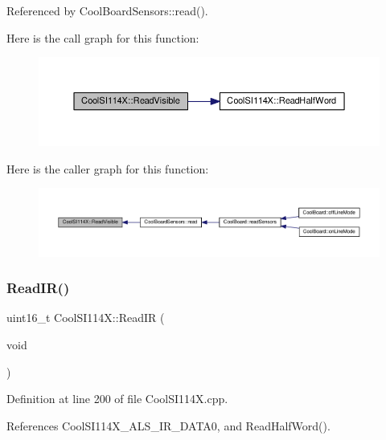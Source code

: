 Referenced by Cool\+Board\+Sensors\+::read().

Here is the call graph for this function\+:\nopagebreak
\begin{figure}[H]
\begin{center}
\leavevmode
\includegraphics[width=350pt]{dd/d67/class_cool_s_i114_x_a42e0e574256341443c647a4c0eda87d5_cgraph}
\end{center}
\end{figure}
Here is the caller graph for this function\+:\nopagebreak
\begin{figure}[H]
\begin{center}
\leavevmode
\includegraphics[width=350pt]{dd/d67/class_cool_s_i114_x_a42e0e574256341443c647a4c0eda87d5_icgraph}
\end{center}
\end{figure}
\mbox{\label{class_cool_s_i114_x_abc536ee7ae8e3ba9d1069acc3889a2cf}} 
\subsubsection{\texorpdfstring{Read\+I\+R()}{ReadIR()}}
{\footnotesize\ttfamily uint16\+\_\+t Cool\+S\+I114\+X\+::\+Read\+IR (\begin{DoxyParamCaption}\item[{void}]{ }\end{DoxyParamCaption})}



Definition at line 200 of file Cool\+S\+I114\+X.\+cpp.



References Cool\+S\+I114\+X\+\_\+\+A\+L\+S\+\_\+\+I\+R\+\_\+\+D\+A\+T\+A0, and Read\+Half\+Word().



